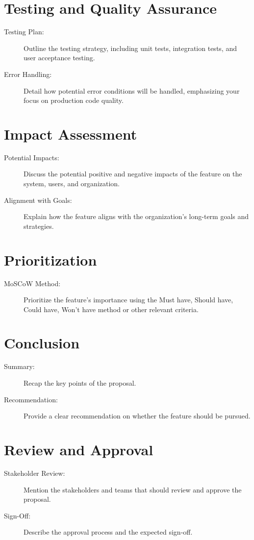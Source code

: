 \documentclass{article}
\begin{document}
\section{Testing and Quality Assurance}
\begin{description}
    \item[Testing Plan:] Outline the testing strategy, including unit tests, integration tests, and user acceptance testing.
    \item[Error Handling:] Detail how potential error conditions will be handled, emphasizing your focus on production code quality.
\end{description}

\section{Impact Assessment}
\begin{description}
    \item[Potential Impacts:] Discuss the potential positive and negative impacts of the feature on the system, users, and organization.
    \item[Alignment with Goals:] Explain how the feature aligns with the organization's long-term goals and strategies.
\end{description}

\section{Prioritization}
\begin{description}
    \item[MoSCoW Method:] Prioritize the feature's importance using the Must have, Should have, Could have, Won't have method or other relevant criteria.
\end{description}

\section{Conclusion}
\begin{description}
    \item[Summary:] Recap the key points of the proposal.
    \item[Recommendation:] Provide a clear recommendation on whether the feature should be pursued.
\end{description}

\section{Review and Approval}
\begin{description}
    \item[Stakeholder Review:] Mention the stakeholders and teams that should review and approve the proposal.
    \item[Sign-Off:] Describe the approval process and the expected sign-off.
\end{description}
\end{document}
